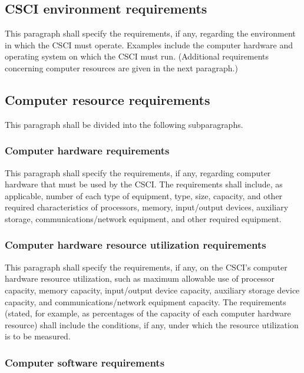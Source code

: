 \documentclass{fidata-report-template}
\begin{document}
\subsection{CSCI environment requirements}

This paragraph shall specify the requirements, if any, regarding the
environment in which the CSCI must operate. Examples include the
computer hardware and operating system on which the CSCI must run.
(Additional requirements concerning computer resources are given in the
next paragraph.)

\subsection{Computer resource requirements}

This paragraph shall be divided into the following subparagraphs.

\subsubsection{Computer hardware requirements}

This paragraph shall specify the requirements, if any, regarding
computer hardware that must be used by the CSCI. The requirements shall
include, as applicable, number of each type of equipment, type, size,
capacity, and other required characteristics of processors, memory,
input/output devices, auxiliary storage, communications/network
equipment, and other required equipment.

\subsubsection{Computer hardware resource utilization
requirements}

This paragraph shall specify the requirements, if any, on the CSCI's
computer hardware resource utilization, such as maximum allowable use of
processor capacity, memory capacity, input/output device capacity,
auxiliary storage device capacity, and communications/network equipment
capacity. The requirements (stated, for example, as percentages of the
capacity of each computer hardware resource) shall include the
conditions, if any, under which the resource utilization is to be
measured.

\subsubsection{Computer software requirements}
\end{document}
